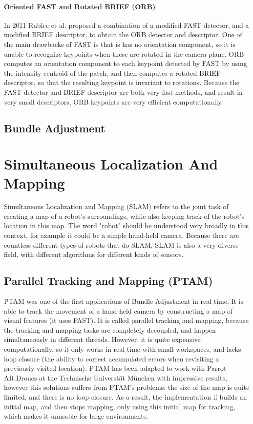 \paragraph{Oriented FAST and Rotated BRIEF (ORB)}
In 2011 Rublee et al. \cite{orb} proposed a combination of a modified FAST detector, and a modified BRIEF descriptor, to obtain the ORB detector and descriptor. One of the main drawbacks of FAST is that is has no orientation component, so it is unable to recognize keypoints when these are rotated in the camera plane. ORB computes an orientation component to each keypoint detected by FAST by using the intensity centroid of the patch, and then computes a rotated BRIEF descriptor, so that the resulting keypoint is invariant to rotations. Because the FAST detector and BRIEF descriptor are both very fast methods, and result in very small descriptors, ORB keypoints are very efficient computationally.

\subsection{Bundle Adjustment}

\section{Simultaneous Localization And Mapping}
Simultaneous Localization and Mapping (SLAM) refers to the joint task of creating a map of a robot's surroundings, while also keeping track of the robot's location in this map. The word "robot" should be understood very broadly in this context, for example it could be a simple hand-held camera. Because there are countless different types of robots that do SLAM, SLAM is also a very diverse field, with different algorithms for different kinds of sensors.

\subsection{Parallel Tracking and Mapping (PTAM)}
PTAM \cite{ptam} was one of the first applications of Bundle Adjustment in real time. It is able to track the movement of a hand-held camera by constructing a map of visual features (it uses FAST). It is called parallel tracking and mapping, because the tracking and mapping tasks are completely decoupled, and happen simultaneously in different threads. However, it is quite expensive computationally, so it only works in real time with small workspaces, and lacks loop closure (the ability to correct accumulated errors when revisiting a previously visited location). PTAM has been adapted to work with Parrot AR.Drones at the Technische Universtät München \cite{engel2011msc} with impressive results, however this solutions suffers from PTAM's problems: the size of the map is quite limited, and there is no loop closure. As a result, the implementation if \cite{engel2011msc} builds an initial map, and then stops mapping, only using this initial map for tracking, which makes it unusable for large environments.


